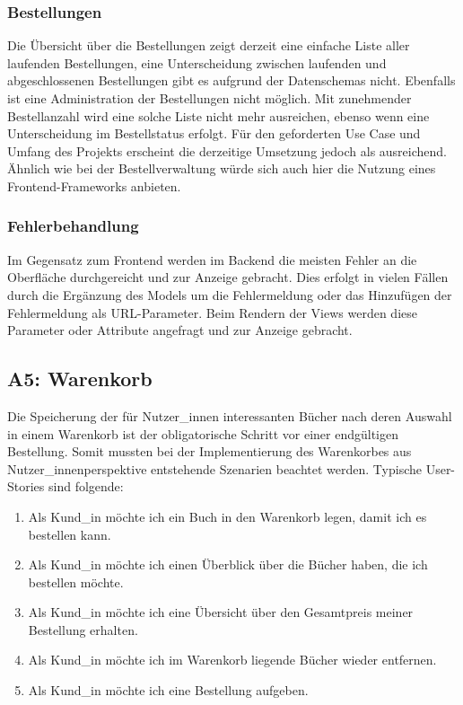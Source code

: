 		\subsubsection{Bestellungen}
		Die Übersicht über die Bestellungen zeigt derzeit eine einfache Liste aller laufenden Bestellungen, eine Unterscheidung zwischen laufenden und abgeschlossenen Bestellungen gibt es aufgrund der Datenschemas nicht. Ebenfalls ist eine Administration der Bestellungen nicht möglich. Mit zunehmender Bestellanzahl wird eine solche Liste nicht mehr ausreichen, ebenso wenn eine Unterscheidung im Bestellstatus erfolgt. Für den geforderten Use Case und Umfang des Projekts erscheint die derzeitige Umsetzung jedoch als ausreichend. Ähnlich wie bei der Bestellverwaltung würde sich auch hier die Nutzung eines Frontend-Frameworks anbieten.
		
		\subsubsection{Fehlerbehandlung}
		Im Gegensatz zum Frontend werden im Backend die meisten Fehler an die Oberfläche durchgereicht und zur Anzeige gebracht. Dies erfolgt in vielen Fällen durch die Ergänzung des Models um die Fehlermeldung oder das Hinzufügen der Fehlermeldung als URL-Parameter. Beim Rendern der Views werden diese Parameter oder Attribute angefragt und zur Anzeige gebracht.
	
	\subsection{A5: Warenkorb}\label{sec:umsetzung:cart}
	Die Speicherung der für Nutzer\_innen interessanten Bücher nach deren Auswahl in einem Warenkorb ist der obligatorische Schritt vor einer endgültigen Bestellung. Somit mussten bei der Implementierung des Warenkorbes aus Nutzer\_innenperspektive entstehende Szenarien beachtet werden. Typische User-Stories sind folgende:
	
	\begin{enumerate}
		\item Als Kund\_in möchte ich ein Buch in den Warenkorb legen, damit ich es bestellen kann.
		\item Als Kund\_in möchte ich einen Überblick über die Bücher haben, die ich bestellen möchte.
		\item Als Kund\_in möchte ich eine Übersicht über den Gesamtpreis meiner Bestellung erhalten.
		\item Als Kund\_in möchte ich im Warenkorb liegende Bücher wieder entfernen.
		\item Als Kund\_in möchte ich eine Bestellung aufgeben.
	\end{enumerate}
	
